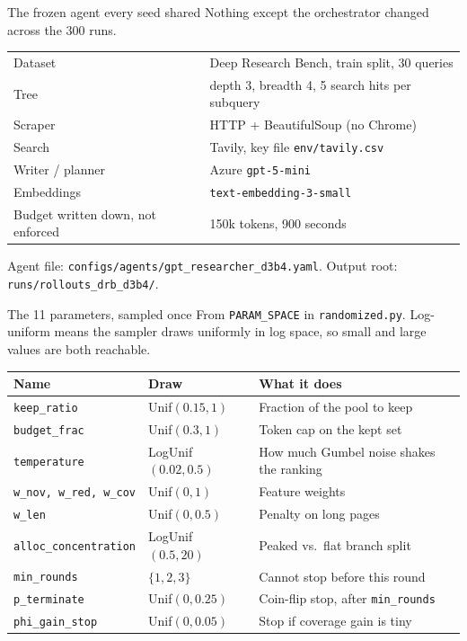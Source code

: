 \documentclass[aspectratio=169,11pt]{beamer}
\begin{document}
\begin{frame}{The frozen agent every seed shared}
  Nothing except the orchestrator changed across the 300 runs.
  \vspace{0.3em}
  \begin{tabular}{ll}
    \hline
    Dataset & Deep Research Bench, train split, 30 queries \\
    Tree & depth 3, breadth 4, 5 search hits per subquery \\
    Scraper & HTTP + BeautifulSoup (no Chrome) \\
    Search & Tavily, key file \texttt{env/tavily.csv} \\
    Writer / planner & Azure \texttt{gpt-5-mini} \\
    Embeddings & \texttt{text-embedding-3-small} \\
    Budget written down, not enforced & 150k tokens, 900 seconds \\
    \hline
  \end{tabular}
  \vspace{0.4em}
  {\small Agent file: \texttt{configs/agents/gpt\_researcher\_d3b4.yaml}. Output root: \texttt{runs/rollouts\_drb\_d3b4/}.}
\end{frame}

\begin{frame}{The 11 parameters, sampled once}
  \small
  From \texttt{PARAM\_SPACE} in \texttt{randomized.py}. Log-uniform means the sampler draws uniformly in log space, so small and large values are both reachable.
  \vspace{0.3em}
  \begin{tabular}{lll}
    \hline
    Name & Draw & What it does \\
    \hline
    \texttt{keep\_ratio} & Unif$(0.15, 1)$ & Fraction of the pool to keep \\
    \texttt{budget\_frac} & Unif$(0.3, 1)$ & Token cap on the kept set \\
    \texttt{temperature} & LogUnif$(0.02, 0.5)$ & How much Gumbel noise shakes the ranking \\
    \texttt{w\_nov, w\_red, w\_cov} & Unif$(0, 1)$ & Feature weights \\
    \texttt{w\_len} & Unif$(0, 0.5)$ & Penalty on long pages \\
    \texttt{alloc\_concentration} & LogUnif$(0.5, 20)$ & Peaked vs.\ flat branch split \\
    \texttt{min\_rounds} & $\{1,2,3\}$ & Cannot stop before this round \\
    \texttt{p\_terminate} & Unif$(0, 0.25)$ & Coin-flip stop, after \texttt{min\_rounds} \\
    \texttt{phi\_gain\_stop} & Unif$(0, 0.05)$ & Stop if coverage gain is tiny \\
    \hline
  \end{tabular}
\end{frame}
\end{document}
